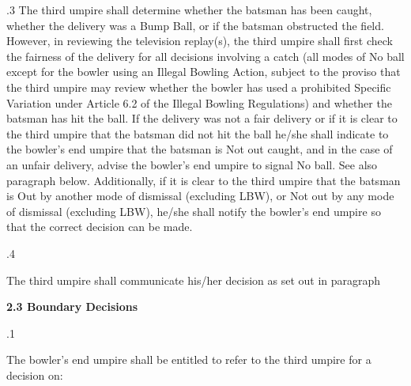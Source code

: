 \documentclass[12pt]{article}
\begin{document}
\vspace{\baselineskip}
\begin{adjustwidth}{0.5in}{0.01in}
{\fontsize{9pt}{10.8pt}.3 \tabto{0.49in} The third umpire shall determine whether the batsman has been caught, whether the delivery was a Bump Ball, or if the batsman obstructed the field. However, in reviewing the television replay(s), the third umpire shall first check the fairness of the delivery for all decisions involving a catch (all modes of No ball except for the bowler using an Illegal Bowling Action, subject to the proviso that the third umpire may review whether the bowler has used a prohibited Specific Variation under Article 6.2 of the Illegal Bowling Regulations) and whether the batsman has hit the ball. If the delivery was not a fair delivery or if it is clear to the third umpire that the batsman did not hit the ball he/she shall indicate to the bowler’s end umpire that the batsman is Not out caught, and in the case of an unfair delivery, advise the bowler’s end umpire to signal No ball. See also paragraph below. Additionally, if it is clear to the third umpire that the batsman is Out by another mode of dismissal (excluding LBW), or Not out by any mode of dismissal (excluding LBW), he/she shall notify the bowler’s end umpire so that the correct decision can be made.\par}\par

\end{adjustwidth}


\vspace{\baselineskip}
{\fontsize{9pt}{10.8pt}.4 \tabto{0.49in} {\fontsize{8pt}{9.6pt}\selectfont The third umpire shall communicate his/her decision as set out in paragraph \par}\par}\par


\vspace{\baselineskip}
{\fontsize{11pt}{13.2pt}\selectfont \textbf{2.3 \tabto{0.47in} Boundary Decisions}\par}\par


\vspace{\baselineskip}
{\fontsize{9pt}{10.8pt}.1 \tabto{0.49in} {\fontsize{8pt}{9.6pt}\selectfont The bowler’s end umpire shall be entitled to refer to the third umpire for a decision on:\par}\par}\par
\end{document}
